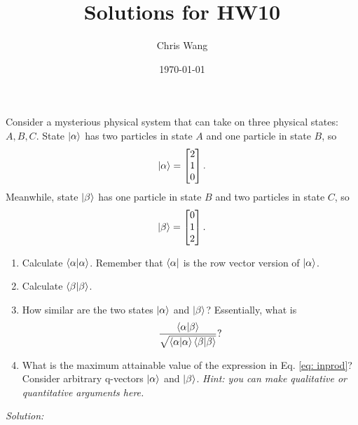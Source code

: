 \documentclass{article}
\title{Solutions for HW10}
\author{Chris Wang}
\date{\today}
\begin{document}
\maketitle

\begin{tcolorbox}[colframe=blue!50!black, arc=2mm, title=\textsc{Practice 1}]
    Consider a mysterious physical system that can take on three physical states: $A,B,C$. State $\ket{\alpha}$ has two particles in state $A$ and one particle in state $B$, so 
    \[
    \ket{\alpha} = \begin{bmatrix}
    2 \\
    1 \\
    0
    \end{bmatrix}.
    \]
    Meanwhile, state $\ket{\beta}$ has one particle in state $B$ and two particles in state $C$, so
    \[
    \ket{\beta} = \begin{bmatrix}
    0 \\
    1 \\
    2
    \end{bmatrix}.
    \]
    \begin{enumerate}[label=\alph*)]
        \item Calculate $\braket{\alpha}$. Remember that $\bra{\alpha}$ is the row vector version of $\ket{\alpha}$.
        \item Calculate $\braket{\beta}$.
        \item How similar are the two states $\ket{\alpha}$ and $\ket{\beta}$? Essentially, what is
        \begin{equation}
            \frac{\braket{\alpha}{\beta}}{\sqrt{\braket{\alpha}\braket{\beta}}}?
            \label{eq: inprod}
        \end{equation}
        \item What is the maximum attainable value of the expression in Eq. \ref{eq: inprod}? Consider arbitrary q-vectors $\ket{\alpha}$ and $\ket{\beta}$. \textit{Hint: you can make qualitative or quantitative arguments here.}
    \end{enumerate}

\end{tcolorbox}

\newpage

\textit{Solution:}

\vspace{1em}
\end{document}

